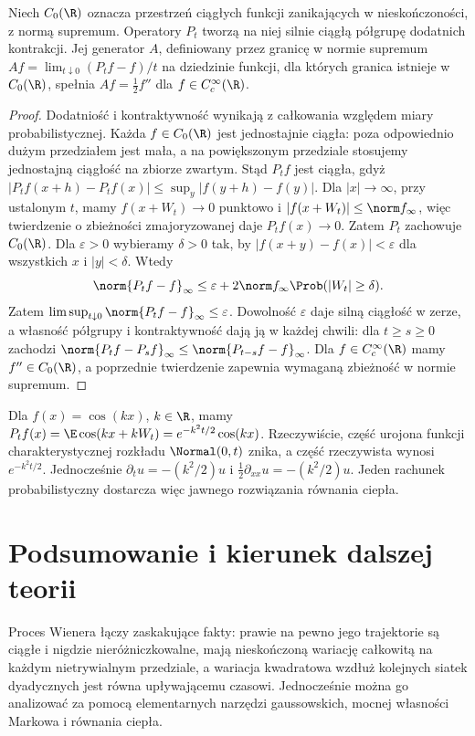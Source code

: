 \begin{stwierdzenie}
Niech $C_0(\R)$ oznacza przestrzeń ciągłych funkcji
zanikających w nieskończoności, z normą supremum.
Operatory $P_t$ tworzą na niej silnie ciągłą półgrupę
dodatnich kontrakcji. Jej generator $A$, definiowany
przez granicę w normie supremum
$Af=\lim_{t\downarrow0}(P_tf-f)/t$ na dziedzinie
funkcji, dla których granica istnieje w $C_0(\R)$,
spełnia $Af=\tfrac12 f''$ dla $f\in C_c^\infty(\R)$.
\end{stwierdzenie}
\begin{proof}
Dodatniość i kontraktywność wynikają z całkowania
względem miary probabilistycznej.
Każda $f\in C_0(\R)$ jest jednostajnie ciągła:
poza odpowiednio dużym przedziałem jest mała,
a na powiększonym przedziale stosujemy jednostajną
ciągłość na zbiorze zwartym.
Stąd $P_tf$ jest ciągła, gdyż
$|P_tf(x+h)-P_tf(x)|\le\sup_y|f(y+h)-f(y)|$.
Dla $|x|\to\infty$, przy ustalonym $t$, mamy
$f(x+W_t)\to0$ punktowo i $|f(x+W_t)|\le\norm f_\infty$,
więc twierdzenie o zbieżności zmajoryzowanej
daje $P_tf(x)\to0$. Zatem $P_t$ zachowuje $C_0(\R)$.
Dla $\varepsilon>0$ wybieramy $\delta>0$ tak, by
$|f(x+y)-f(x)|<\varepsilon$ dla wszystkich $x$
i $|y|<\delta$. Wtedy
\[
\norm{P_tf-f}_\infty
\le\varepsilon+2\norm f_\infty\Prob(|W_t|\ge\delta).
\]
Zatem $\limsup_{t\downarrow0}\norm{P_tf-f}_\infty
\le\varepsilon$. Dowolność $\varepsilon$
daje silną ciągłość w zerze, a własność półgrupy i kontraktywność dają ją w każdej
chwili: dla $t\ge s\ge0$ zachodzi
$\norm{P_tf-P_sf}_\infty\le\norm{P_{t-s}f-f}_\infty$.
Dla $f\in C_c^\infty(\R)$ mamy $f''\in C_0(\R)$,
a poprzednie twierdzenie zapewnia wymaganą
zbieżność w normie supremum.
\end{proof}

\begin{przyklad}
Dla $f(x)=\cos(kx)$, $k\in\R$, mamy
$P_tf(x)=\E\cos(kx+kW_t)
=e^{-k^2t/2}\cos(kx)$.
Rzeczywiście, część urojona funkcji charakterystycznej
rozkładu $\Normal(0,t)$ znika, a część rzeczywista
wynosi $e^{-k^2t/2}$. Jednocześnie
$\partial_tu=-(k^2/2)u$ i
$\frac12\partial_{xx}u=-(k^2/2)u$.
Jeden rachunek probabilistyczny dostarcza więc
jawnego rozwiązania równania ciepła.
\end{przyklad}

\section{Podsumowanie i kierunek dalszej teorii}
Proces Wienera łączy zaskakujące fakty: prawie na pewno
jego trajektorie są ciągłe i nigdzie nieróżniczkowalne,
mają nieskończoną wariację całkowitą na każdym
nietrywialnym przedziale, a wariacja kwadratowa
wzdłuż kolejnych siatek dyadycznych jest równa
upływającemu czasowi.
Jednocześnie można go analizować za pomocą elementarnych
narzędzi gaussowskich, mocnej własności Markowa i
równania ciepła.

